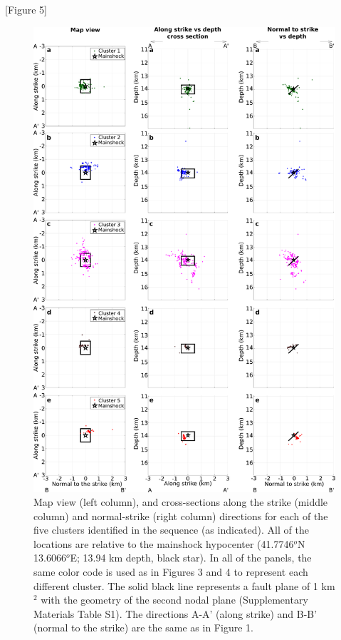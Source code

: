 \documentclass[a4paper,12pt,twoside]{article}
\begin{document}
\begin{center}
   [Figure 5]
\end{center}

\begin{figure}
    \centering
     \includegraphics[width=0.9\linewidth]{maps_clusters.pdf}     \caption{Map view (left column), and cross-sections along the strike (middle column) and normal-strike (right column) directions for each of the five clusters identified in the sequence (as indicated). All of the locations are relative to the mainshock hypocenter (41.7746$^o$N 13.6066$^o$E; 13.94 km depth, black star). In all of the panels, the same color code is used as in Figures 3 and 4 to represent each different cluster. The solid black line represents a fault plane of 1 km$^2$ with the geometry of the second nodal plane (Supplementary Materials Table S1). The directions A-A' (along strike) and B-B' (normal to the strike) are the same as in Figure 1.}
\end{figure}          \label{fig:maps_each_cluster}
\end{document}
